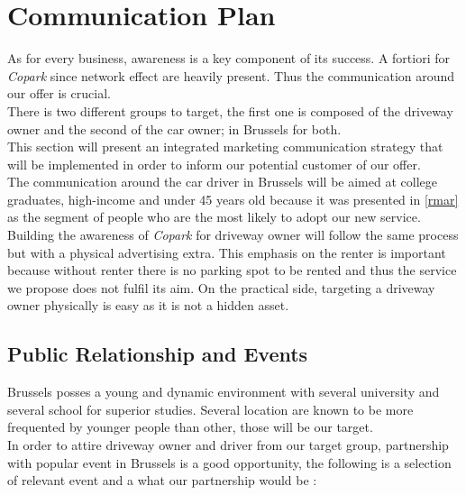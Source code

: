 \documentclass[12pt,a4paper,oneside]{book}
\newcommand{\bp}{\textit{Copark }}
\begin{document}
\section{Communication Plan}

As for every business, awareness is a key component of its success. A fortiori for \bp since network effect are heavily present. Thus the communication around our offer is crucial.\\
There is two different groups to target, the first one is composed of the driveway owner and the second of the car owner; in Brussels for both.\\
This section will present an integrated marketing communication strategy that will be implemented in order to inform our potential customer of our offer.\\
The communication around the car driver in Brussels will be aimed at college graduates, high-income and under 45 years old because it was presented in \autoref{rmar} as the segment of people who are the most likely to adopt our new service. Building the awareness of \bp for driveway owner will follow the same process but with a physical advertising extra. This emphasis on the renter is important because without renter there is no parking spot to be rented and thus the service we propose does not fulfil its aim. On the practical side, targeting a driveway owner physically is easy as it is not a hidden asset.

\subsection{Public Relationship and Events}
Brussels posses a young and dynamic environment with several university and several school for superior studies. Several location are known to be more frequented by younger people than other, those will be our target.\\
In order to attire driveway owner and driver from our target group, partnership with popular event in Brussels is a good opportunity, the following is a selection of relevant event and a what our partnership would be :
\end{document}

